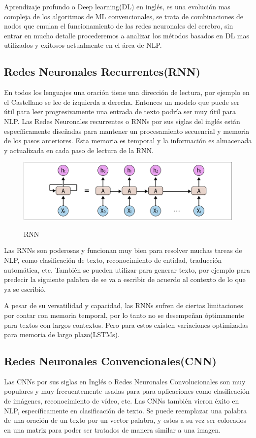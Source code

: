 Aprendizaje profundo o Deep learning(DL) en inglés, es una evolución mas compleja de los algoritmos
de ML convencionales,
se trata de combinaciones de nodos que emulan el funcionamiento de las redes neuronales del
cerebro, sin entrar en mucho detalle procederemos a analizar los métodos basados en DL mas
utilizados y exitosos actualmente en el área de NLP.

\subsection{Redes Neuronales Recurrentes(RNN)}

En todos los lenguajes una oración tiene una dirección de lectura, por ejemplo en el Castellano se
lee de izquierda a derecha. Entonces un modelo que puede ser útil para leer progresivamente una
entrada de texto podría ser muy útil para NLP. Las Redes Neuronales recurrentes o RNNs por sus
siglas del inglés están específicamente diseñadas para mantener
un procesamiento secuencial y memoria de los pasos anteriores. Esta memoria es temporal y la
información es almacenada y
actualizada en cada paso de lectura de la RNN.

\begin{figure}[h]
	\centering
	\includegraphics[width=\textwidth]{imagenes/Cap 2/rnn.png}
	\caption{RNN}
	\label{fig:RNN}
	\cite{sowmya_practical_npl}
\end{figure}

Las RNNs son poderosas y funcionan muy bien para resolver muchas tareas de NLP, como clasificación
de texto, reconocimiento
de entidad, traducción automática, etc. También se pueden utilizar para generar texto, por ejemplo
para predecir la
siguiente palabra de se va a escribir de acuerdo al contexto de lo que ya se escribió.

A pesar de su versatilidad y capacidad, las RNNs sufren de ciertas limitaciones por contar con
memoria temporal, por lo
tanto no se desempeñan óptimamente para textos con largos contextos. Pero para estos existen
variaciones optimizadas para
memoria de largo plazo(LSTMs).

\subsection{Redes Neuronales Convencionales(CNN)}
Las CNNs por sus siglas en Inglés o Redes Neuronales Convolucionales son muy populares y muy
frecuentemente usadas para
para aplicaciones como clasificación de imágenes, reconocimiento de vídeo, etc. Las CNNs también
vieron éxito en NLP,
específicamente en clasificación de texto. Se puede reemplazar una palabra de una oración de un
texto por un vector
palabra, y estos a su vez ser colocados en una matriz para poder ser tratados de manera similar a
una imagen.

